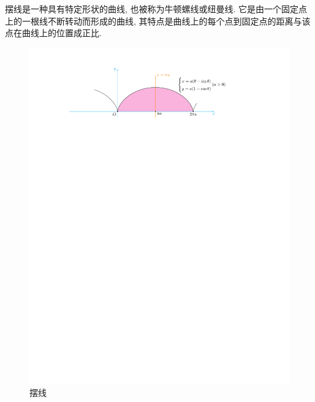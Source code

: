摆线是一种具有特定形状的曲线, 也被称为牛顿螺线或纽曼线.
它是由一个固定点上的一根线不断转动而形成的曲线, 其特点是曲线上的每个点到固定点的距离与该点在曲线上的位置成正比.

\begin{figure}[H]
    \centering
    \includegraphics{figures/Cycloid.pdf}
    \caption{摆线}
    \label{cycloid}
\end{figure}

